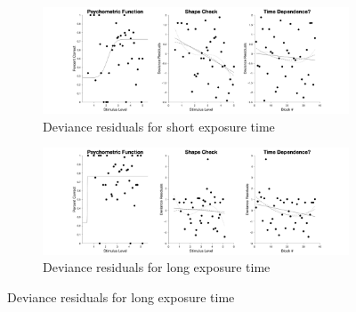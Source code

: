\documentclass{article}
\begin{document}
\begin{figure}[!hb]
    \begin{subfigure}{\textwidth}
        \centering
        \includegraphics[width = \linewidth]{Thesis/plots/gof/segDist/segDist_eb_short_deviance.png}
        \caption{Deviance residuals for short exposure time}
    \end{subfigure}
    
    \begin{subfigure}{\textwidth}
        \centering
        \includegraphics[width = \linewidth]{Thesis/plots/gof/segDist/segDist_eb_long_deviance.png}
        \caption{Deviance residuals for long exposure time}
    \end{subfigure}
\end{figure}

\clearpage
\end{document}
